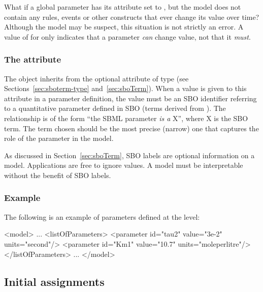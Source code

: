 What if a global parameter has its  attribute set to
, but the model does not contain any rules, events or
other constructs that ever change its value over time?  Although
the model may be suspect, this situation is not strictly an error.
A value of  for  only indicates that a
parameter \emph{can} change value, not that it \emph{must}.


\subsubsection{The  attribute}
\label{sec:parameter-sboterm}

The \Parameter object inherits from \SBase the optional  attribute of
type  (see Sections~\ref{sec:sboterm-type}
and~\ref{sec:sboTerm}).  When a value is given to this attribute in a
parameter definition, the value must be an SBO identifier
referring to a quantitative parameter defined in SBO (\ie terms
derived from \sboparameter).  The relationship is of the form
``the SBML parameter \emph{is a} X'', where X is the SBO term.
The term chosen should be the most precise (narrow) one that
captures the role of the parameter in the model.

As discussed in Section~\ref{sec:sboTerm}, SBO labels are optional
information on a model.  Applications are free to ignore
 values.  A model must be interpretable without the
benefit of SBO labels.


\subsubsection{Example}

The following is an example of parameters defined at the \Model level:

\begin{example}
<model>
    ...
    <listOfParameters>
        <parameter id="tau2" value="3e-2" units="second"/>
        <parameter id="Km1" value="10.7" units="moleperlitre"/>
    </listOfParameters>
    ...
</model>
\end{example}
\vspace*{-1ex}


\subsection{Initial assignments}
\label{sec:initialAssignment}

